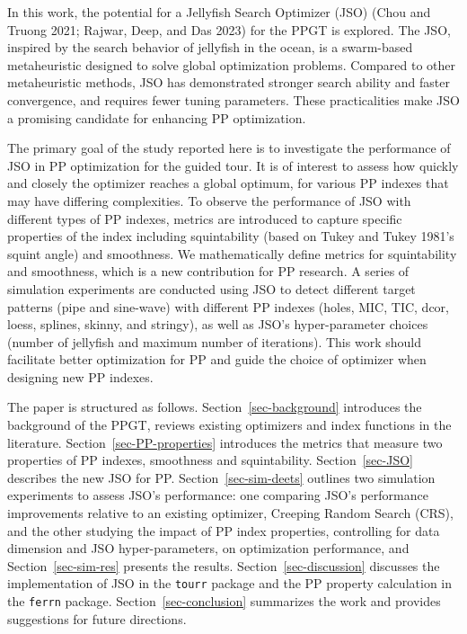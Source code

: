 \documentclass[
  12pt,
]{interact}
\theoremstyle{plain}
\begin{document}
In this work, the potential for a Jellyfish Search Optimizer (JSO) (Chou
and Truong 2021; Rajwar, Deep, and Das 2023) for the PPGT is explored.
The JSO, inspired by the search behavior of jellyfish in the ocean, is a
swarm-based metaheuristic designed to solve global optimization
problems. Compared to other metaheuristic methods, JSO has demonstrated
stronger search ability and faster convergence, and requires fewer
tuning parameters. These practicalities make JSO a promising candidate
for enhancing PP optimization.

The primary goal of the study reported here is to investigate the
performance of JSO in PP optimization for the guided tour. It is of
interest to assess how quickly and closely the optimizer reaches a
global optimum, for various PP indexes that may have differing
complexities. To observe the performance of JSO with different types of
PP indexes, metrics are introduced to capture specific properties of the
index including squintability (based on Tukey and Tukey 1981's squint
angle) and smoothness. We mathematically define metrics for
squintability and smoothness, which is a new contribution for PP
research. A series of simulation experiments are conducted using JSO to
detect different target patterns (pipe and sine-wave) with different PP
indexes (holes, MIC, TIC, dcor, loess, splines, skinny, and stringy), as
well as JSO's hyper-parameter choices (number of jellyfish and maximum
number of iterations). This work should facilitate better optimization
for PP and guide the choice of optimizer when designing new PP indexes.

The paper is structured as follows. Section~\ref{sec-background}
introduces the background of the PPGT, reviews existing optimizers and
index functions in the literature. Section~\ref{sec-PP-properties}
introduces the metrics that measure two properties of PP indexes,
smoothness and squintability. Section~\ref{sec-JSO} describes the new
JSO for PP. Section~\ref{sec-sim-deets} outlines two simulation
experiments to assess JSO's performance: one comparing JSO's performance
improvements relative to an existing optimizer, Creeping Random Search
(CRS), and the other studying the impact of PP index properties,
controlling for data dimension and JSO hyper-parameters, on optimization
performance, and Section~\ref{sec-sim-res} presents the results.
Section~\ref{sec-discussion} discusses the implementation of JSO in the
\texttt{tourr} package and the PP property calculation in the
\texttt{ferrn} package. Section~\ref{sec-conclusion} summarizes the work
and provides suggestions for future directions.
\end{document}

